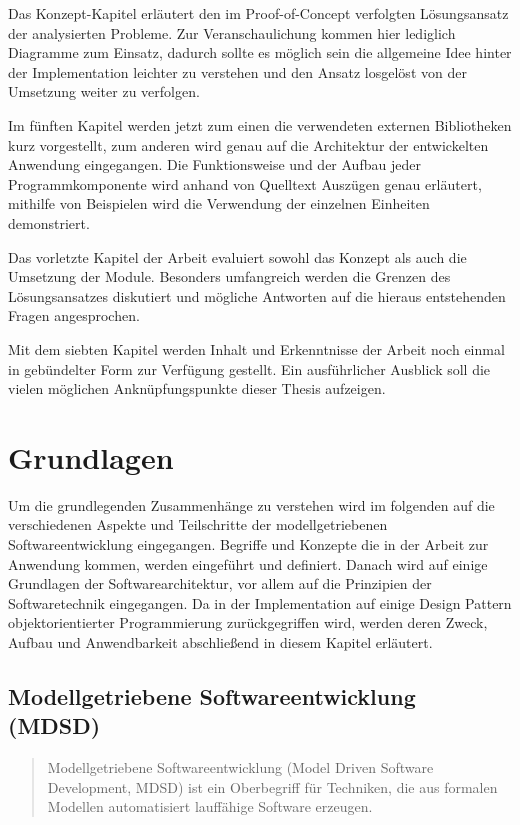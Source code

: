 \documentclass[12pt,oneside,a4paper,parskip]{scrbook}
\begin{document}
Das Konzept-Kapitel erläutert den im Proof-of-Concept verfolgten Lösungsansatz der analysierten Probleme. Zur Veranschaulichung kommen hier lediglich Diagramme zum Einsatz, dadurch sollte es möglich sein die allgemeine Idee hinter der Implementation leichter zu verstehen und den Ansatz losgelöst von der Umsetzung weiter zu verfolgen.

Im fünften Kapitel werden jetzt zum einen die verwendeten externen Bibliotheken kurz vorgestellt, zum anderen wird genau auf die Architektur der entwickelten Anwendung eingegangen. Die Funktionsweise und der Aufbau jeder Programmkomponente wird anhand von Quelltext Auszügen genau erläutert, mithilfe von Beispielen wird die Verwendung der einzelnen Einheiten demonstriert.

Das vorletzte Kapitel der Arbeit evaluiert sowohl das Konzept als auch die Umsetzung der Module. Besonders umfangreich werden die Grenzen des Lösungsansatzes diskutiert und mögliche Antworten auf die hieraus entstehenden Fragen angesprochen.

Mit dem siebten Kapitel werden Inhalt und Erkenntnisse der Arbeit noch einmal in gebündelter Form zur Verfügung gestellt. Ein ausführlicher Ausblick soll die vielen möglichen Anknüpfungspunkte dieser Thesis aufzeigen.

\chapter{Grundlagen}

Um die grundlegenden Zusammenhänge zu verstehen wird im folgenden auf die verschiedenen Aspekte und Teilschritte der modellgetriebenen Softwareentwicklung eingegangen. Begriffe und Konzepte die in der Arbeit zur Anwendung kommen, werden eingeführt und definiert. Danach wird auf einige Grundlagen der Softwarearchitektur, vor allem auf die Prinzipien der Softwaretechnik eingegangen. Da in der Implementation auf einige Design Pattern objektorientierter Programmierung zurückgegriffen wird, werden deren Zweck, Aufbau und Anwendbarkeit abschließend in diesem Kapitel erläutert.

\section{Modellgetriebene Softwareentwicklung (MDSD)}

\begin{quote}\glqq Modellgetriebene Softwareentwicklung (Model Driven Software Development, MDSD) ist ein Oberbegriff für Techniken, die aus formalen Modellen automatisiert lauffähige Software erzeugen.\grqq \end{quote}
\end{document}
